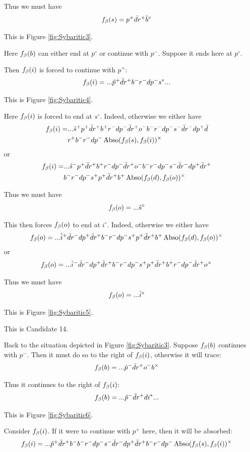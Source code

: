 Thus we must have
\[
f_\beta(s) = p^+ \bar{d} r^+ \hat{b}^\circ
\]

This is Figure \ref{fig:Sybaritic3}.

Here $f_\beta(b)$ can either end at $p^\circ$ or continue with $p^-$. Suppose it ends here at $p^\circ$.

Then $f_\beta(i)$ is forced to continue with $p^+$:
\[
f_\beta(i) = ...\hat{p}^+ \bar{d} r^+ b^- r^- d p^- s^*...
\]

This is Figure \ref{fig:Sybaritic4}. 

Here $f_\beta(i)$ is forced to end at $s^\circ$. Indeed, otherwise we either have
\begin{align*}
    f_\beta(i) =& ...\hat{s}^+ p^+ \bar{d} r^+ b^+ r^- d p^- \bar{d} r^+ o^- b^- r^- d p^- s^- \bar{d} r^- d p^+ \bar{d}\\
    &r^+ b^- r^- d p^- \operatorname{Abso}(f_\beta(s), f_\beta(i))^\times
\end{align*}
or
\begin{align*}
    f_\beta(i) =& ...\hat{s}^- p^+ \bar{d} r^+ b^+ r^- d p^- \bar{d} r^+ o^- b^- r^- d p^- s^- \bar{d} r^- d p^+ \bar{d} r^+\\
    &b^- r^- d p^- s^+ p^+ \bar{d} r^+ b^+ \operatorname{Abso}(f_\beta(d), f_\beta(o))^\times
\end{align*}

Thus we must have
\[
f_\beta(o) = ...\hat{s}^\circ
\]

This then forces $f_\beta(o)$ to end at $i^\circ$. Indeed, otherwise we either have
\[
f_\beta(o) = ...\hat{i}^+ \bar{d} r^- d p^+ \bar{d} r^+ b^- r^- d p^- s^+ p^+ \bar{d} r^+ b^+ \operatorname{Abso}(f_\beta(d), f_\beta(o))^\times
\]
or
\[
f_\beta(o) = ...\hat{i}^- \bar{d} r^- d p^+ \bar{d} r^+ b^- r^- d p^- s^+ p^+ \bar{d} r^+ b^+ r^- d p^- \bar{d} r^+ o^\times
\]

Thus we must have
\[
f_\beta(o) = ...\hat{i}^\circ
\]

This is Figure \ref{fig:Sybaritic5}.

This is Candidate 14.

Back to the situation depicted in Figure \ref{fig:Sybaritic3}. Suppose $f_\beta(b)$ continues with $p^-$. Then it must do so to the right of $f_\beta(i)$, otherwise it will trace:
\[
f_\beta(b) = ... \hat{p}^- \bar{d} r^+ o^- b^\times
\]

Thus it continues to the right of $f_\beta(i)$:
\[
f_\beta(b) = ...\hat{p}^- \bar{d} r^+ d i^*...
\]

This is Figure \ref{fig:Sybaritic6}.

Consider $f_\beta(i)$. If it were to continue with $p^+$ here, then it will be absorbed:
\[
f_\beta(i) = ...\hat{p}^+ \bar{d} r^+ b^- b^- r^- d p^- s^- \bar{d} r^- d p^+ \bar{d} r^+ b^- r^- d p^- \operatorname{Abso}(f_\beta(s), f_\beta(i))^\times
\]

